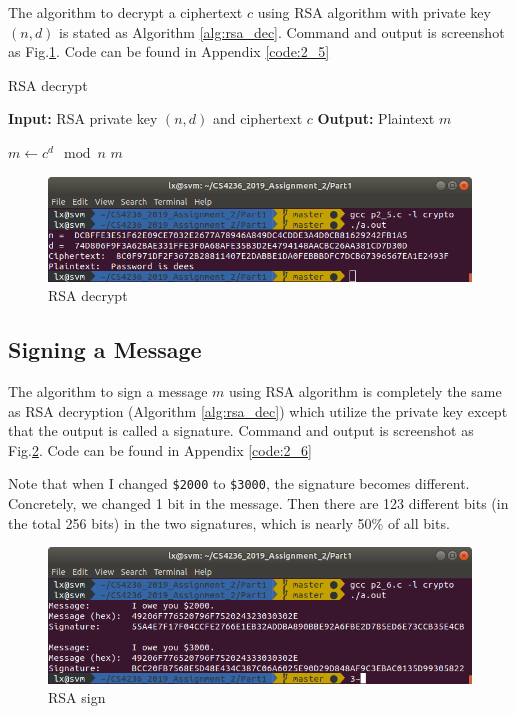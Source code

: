 The algorithm to decrypt a ciphertext $c$ using RSA algorithm with private key $(n, d) $ is stated as Algorithm \ref{alg:rsa_dec}.
Command and output is screenshot as Fig.\ref{fig:p2_5}.
Code can be found in Appendix \ref{code:2_5}

\begin{algorithm}
\caption{RSA decrypt}
\label{alg:rsa_dec}
\begin{algorithmic}
\STATE \textbf{Input:} RSA private key $(n, d)$ and ciphertext $c$
\STATE \textbf{Output:} Plaintext $m$

\STATE $ m \gets c^d \mod{n} $
\RETURN $ m $
\end{algorithmic}
\end{algorithm}

\begin{figure}[!t]
\centering
\includegraphics[width=\columnwidth]{pictures/p2_5.png}
\caption{
    RSA decrypt
}
\label{fig:p2_5}
\end{figure}

\subsection{Signing a Message}
\label{subs:sign}

The algorithm to sign a message $m$ using RSA algorithm is completely the same as RSA decryption (Algorithm \ref{alg:rsa_dec}) which utilize the private key except that the output is called a signature.
Command and output is screenshot as Fig.\ref{fig:p2_6}.
Code can be found in Appendix \ref{code:2_6}

Note that when I changed \texttt{\$2000} to \texttt{\$3000}, the signature becomes different. Concretely, we changed 1 bit in the message. Then there are 123 different bits (in the total 256 bits) in the two signatures, which is nearly 50\% of all bits.

\begin{figure}[!t]
\centering
\includegraphics[width=\columnwidth]{pictures/p2_6.png}
\caption{
    RSA sign
}
\label{fig:p2_6}
\end{figure}

